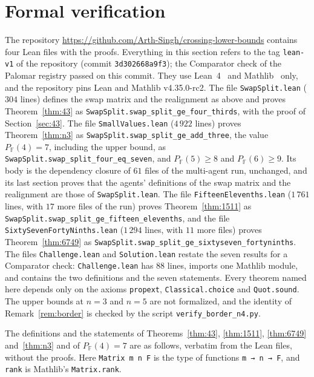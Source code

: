 \documentclass[11pt]{amsart}
\theoremstyle{remark}
\newcommand{\F}{\mathbb{F}}
\begin{document}
\section{Formal verification}\label{sec:lean}

{\sloppy The repository \url{https://github.com/Arth-Singh/crossing-lower-bounds} contains four Lean files
with the proofs. Everything in this section refers to the tag \texttt{lean-v1} of the repository (commit
\texttt{3d302668a9f3}); the Comparator check of the Palomar registry passed on this commit. They use Lean~4~\cite{Lean4} and Mathlib~\cite{Mathlib} only, and the repository pins Lean
and Mathlib v4.35.0-rc2. The file \texttt{SwapSplit.lean} ($304$ lines) defines the swap matrix and the
realignment as above and proves Theorem~\ref{thm:43} as \texttt{SwapSplit.swap\_split\_ge\_four\_thirds}, with
the proof of Section~\ref{sec:43}. The file \texttt{SmallValues.lean} ($4\,922$ lines) proves
Theorem~\ref{thm:n3} as \texttt{SwapSplit.swap\_split\_ge\_add\_three}, the value $P_\F(4)=7$, including the
upper bound, as \texttt{SwapSplit.swap\_split\_four\_eq\_seven}, and $P_\F(5)\ge8$ and $P_\F(6)\ge9$. Its body
is the dependency closure of $61$ files of the multi-agent run, unchanged, and its last section proves that
the agents' definitions of the swap matrix and the realignment are those of \texttt{SwapSplit.lean}. The file
\texttt{FifteenElevenths.lean} ($1\,761$ lines, with $17$ more files of the run) proves
Theorem~\ref{thm:1511} as \texttt{SwapSplit.swap\_split\_ge\_fifteen\_elevenths}, and the file
\texttt{SixtySevenFortyNinths.lean} ($1\,294$ lines, with $11$ more files) proves Theorem~\ref{thm:6749}
as \texttt{SwapSplit.swap\_split\_ge\_sixtyseven\_fortyninths}. The files \texttt{Challenge.lean} and
\texttt{Solution.lean} restate the seven results for a Comparator check: \texttt{Challenge.lean} has
$88$ lines, imports one Mathlib module, and contains the two definitions and the seven statements. Every
theorem named here depends only on the axioms \texttt{propext}, \texttt{Classical.choice} and
\texttt{Quot.sound}. The upper bounds at $n=3$ and $n=5$ are not formalized, and the identity of
Remark~\ref{rem:border} is checked by the script \texttt{verify\_border\_n4.py}.\par}

The definitions and the statements of Theorems~\ref{thm:43}, \ref{thm:1511}, \ref{thm:6749}
and~\ref{thm:n3} and of $P_\F(4)=7$ are as follows, verbatim from the Lean files, without the proofs. Here \texttt{Matrix m n F} is the type of functions
\texttt{m → n → F}, and \texttt{rank} is Mathlib's \texttt{Matrix.rank}.
\end{document}
